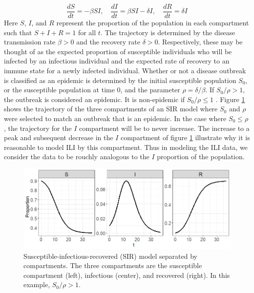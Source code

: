 \begin{equation}
    \label{eq:sir_diff}
    \frac{dS}{dt} = -\beta SI, \quad \frac{dI}{dt} = \beta S I - \delta I, \quad \frac{dR}{dt} = \delta I
\end{equation}
Here $S$, $I$, and $R$ represent the proportion of the population in each 
compartment such that $S + I + R = 1$ for all $t$. The trajectory is 
determined by the disease transmission rate $\beta > 0$ and the recovery 
rate $\delta > 0$. Respectively, these may be thought of as the expected 
proportion of susceptible individuals who will be infected by an infectious 
individual and the expected rate of recovery to an immune state for a newly 
infected individual. Whether or not a disease outbreak is classified as an 
epidemic is determined by the initial susceptible population $S_0$, or the 
susceptible population at time $0$, and the parameter $\rho = \delta/
\beta$. If $S_0/\rho > 1$, the outbreak is considered an epidemic. It is 
non-epidemic if $S_0/\rho \leq 1$ \cite[]{osthus2019dynamic}. Figure 
\ref{fig:sir_traj} shows the trajectory of the three compartments of an SIR 
model where $S_0$ and $\rho$ were selected to match an outbreak that is an 
epidemic. In the case where $S_0 \leq \rho$, the trajectory for the $I$ 
compartment will be to never increase. The increase to a peak and subsequent 
decrease in the $I$ compartment of figure \ref{fig:sir_traj} illustrate why
it is 
reasonable to model ILI by this compartment. Thus in modeling the ILI data, 
we consider the data to be rouchly 
analogous to the $I$ proportion of the population.

\begin{figure}[hbt!]
    \centering
    \includegraphics[scale=.6]{Images/sir_traj.png}
    \caption{Susceptible-infectious-recovered (SIR) model separated by 
    compartments. The three compartments are the susceptible compartment 
    (left), infectious (center), and recovered (right). In this 
    example, $S_0/\rho > 1$.}
    \label{fig:sir_traj}
\end{figure}





